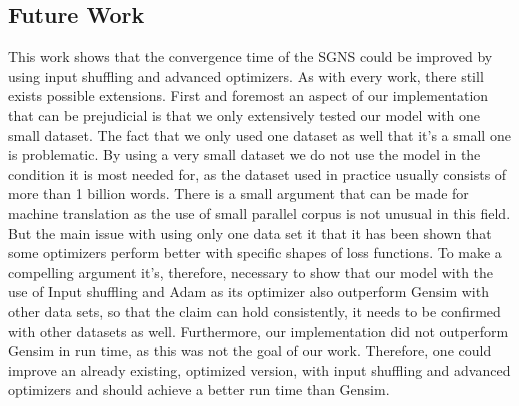 \subsection{Future Work}
This work shows that the convergence time of the SGNS could be improved by using input shuffling and advanced optimizers. As with every work, there still exists possible extensions. First and foremost an aspect of our implementation that can be prejudicial is that we only extensively tested our model with one small dataset. The fact that we only used one dataset as well that it's a small one is problematic. By using a very small dataset we do not use the model in the condition it is most needed for, as the dataset used in practice usually consists of more than 1 billion words. There is a small argument that can be made for machine translation as the use of small parallel corpus is not unusual in this field. But the main issue with using only one data set it that it has been shown that some optimizers perform better with specific shapes of loss functions. To make a compelling argument it's, therefore, necessary to show that our model with the use of Input shuffling and Adam as its optimizer also outperform Gensim with other data sets, so that the claim can hold consistently, it needs to be confirmed with other datasets as well.
Furthermore, our implementation did not outperform Gensim in run time, as this was not the goal of our work. Therefore, one could improve an already existing, optimized version, with input shuffling and advanced optimizers and should achieve a better run time than Gensim.